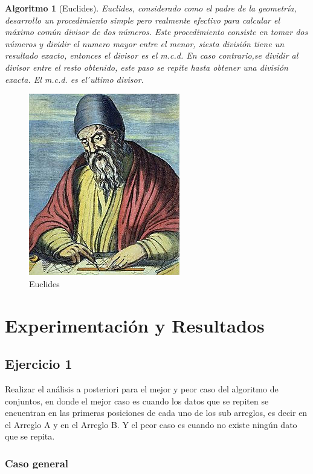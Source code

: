 \documentclass[12pt,twoside]{article}
\newtheorem{algoritmo}{Algoritmo}
\begin{document}
\clearpage

\begin{algoritmo}[Euclides]
Euclides, considerado como el padre de la geometría, desarrollo un procedimiento simple  pero  realmente  efectivo  para  calcular  el  máximo  común  divisor  de  dos  números.  Este procedimiento consiste en tomar dos números y dividir el numero mayor entre el menor, siesta división tiene un resultado exacto, entonces el divisor es el m.c.d. En caso contrario,se dividir al divisor entre el resto obtenido, este paso se repite hasta obtener una división exacta. El m.c.d. es el  ́ultimo divisor.
\end{algoritmo}

\begin{figure}[h!]
\centering
\includegraphics[scale=1.6]{retrato-Euclides-249x300.jpg}
\caption{Euclides}
\label{fig:universe}
\end{figure}

\clearpage

 \section{Experimentaci\'on y Resultados}

\subsection{Ejercicio 1}
Realizar el análisis a posteriori para el mejor y peor caso del algoritmo de conjuntos, en donde el mejor caso es cuando los datos que se repiten se encuentran en las primeras posiciones de cada uno de los sub arreglos, es decir en el Arreglo A y en el Arreglo B. Y el peor caso es cuando no existe ningún dato que se repita. 
\subsubsection{Caso general}

\clearpage
\end{document}
